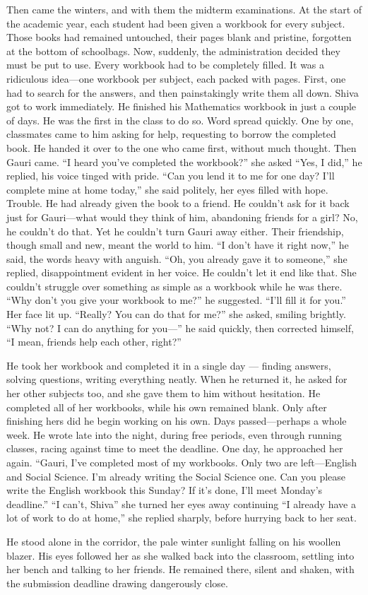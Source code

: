 Then came the winters, and with them the midterm examinations. At the start of the academic year, each student had been given a workbook for every subject. Those books had remained untouched, their pages blank and pristine, forgotten at the bottom of schoolbags. Now, suddenly, the administration decided they must be put to use. Every workbook had to be completely filled. It was a ridiculous idea—one workbook per subject, each packed with pages. First, one had to search for the answers, and then painstakingly write them all down. Shiva got to work immediately. He finished his Mathematics workbook in just a couple of days. He was the first in the class to do so. Word spread quickly. One by one, classmates came to him asking for help, requesting to borrow the completed book. He handed it over to the one who came first, without much thought. Then Gauri came. ``I heard you've completed the workbook?'' she asked ``Yes, I did,'' he replied, his voice tinged with pride. ``Can you lend it to me for one day? I'll complete mine at home today,'' she said politely, her eyes filled with hope. Trouble. He had already given the book to a friend. He couldn't ask for it back just for Gauri—what would they think of him, abandoning friends for a girl? No, he couldn't do that. Yet he couldn't turn Gauri away either. Their friendship, though small and new, meant the world to him. ``I don't have it right now,'' he said, the words heavy with anguish. ``Oh, you already gave it to someone,'' she replied, disappointment evident in her voice. He couldn't let it end like that. She couldn't struggle over something as simple as a workbook while he was there. ``Why don't you give your workbook to me?'' he suggested. ``I'll fill it for you.'' Her face lit up. ``Really? You can do that for me?'' she asked, smiling brightly.
``Why not? I can do anything for you—'' he said quickly, then corrected himself, ``I mean, friends help each other, right?''

He took her workbook and completed it in a single day — finding answers, solving questions, writing everything neatly. When he returned it, he asked for her other subjects too, and she gave them to him without hesitation. He completed all of her workbooks, while his own remained blank. Only after finishing hers did he begin working on his own. Days passed—perhaps a whole week. He wrote late into the night, during free periods, even through running classes, racing against time to meet the deadline. One day, he approached her again. ``Gauri, I've completed most of my workbooks. Only two are left—English and Social Science. I'm already writing the Social Science one. Can you please write the English workbook this Sunday? If it's done, I'll meet Monday's deadline.'' ``I can't, Shiva'' she turned her eyes away continuing ``I already have a lot of work to do at home,'' she replied sharply, before hurrying back to her seat.

He stood alone in the corridor, the pale winter sunlight falling on his woollen blazer. His eyes followed her as she walked back into the classroom, settling into her bench and talking to her friends. He remained there, silent and shaken, with the submission deadline drawing dangerously close.
